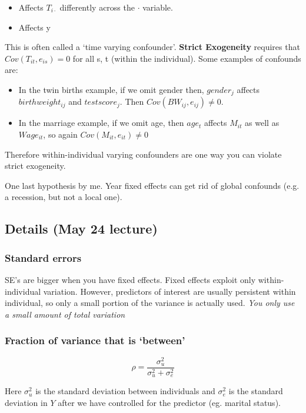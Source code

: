 \documentclass[12 pt, leqno]{article}
\begin{document}
\begin{itemize}
\item Affects $T_{i\cdot}$ differently across the $\cdot$ variable.
\item Affects y
\end{itemize}

This is often called a `time varying confounder'. \textbf{Strict Exogeneity} requires that $Cov(T_{it}, e_{is}) = 0$ for all s, t (within the individual). Some examples of confounds are:

\begin{itemize}
\item In the twin births example, if we omit gender then, $gender_j$ affects $birthweight_{ij}$ and $testscore_j$. Then $Cov(BW_{ij}, e_{ij}) \neq 0$.
\item In the marriage example, if we omit age, then $age_t$ affects $M_{it}$ as well as $Wage_{it}$, so again $Cov(M_{it}, e_{it}) \neq 0 $
\end{itemize} 

Therefore within-individual varying confounders are one way you can violate strict exogeneity.

One last hypothesis by me. Year fixed effects can get rid of global confounds (e.g. a recession, but not a local one).

\subsection{Details (May 24 lecture)} 

\subsubsection{Standard errors} SE's are bigger when you have fixed effects. Fixed effects exploit only within-individual variation. However, predictors of interest are usually persistent within individual, so only a small portion of the variance is actually used. \textit{You only use a small amount of total variation}

\subsubsection{Fraction of variance that is `between'}

$$\rho = \frac{\sigma_u^2}{\sigma_u^2 + \sigma_e^2}$$

Here $\sigma_u^2$ is the standard deviation between individuals and $\sigma_e^2$ is the standard deviation in $Y$ after we have controlled for the predictor (eg. marital status).
\end{document}
